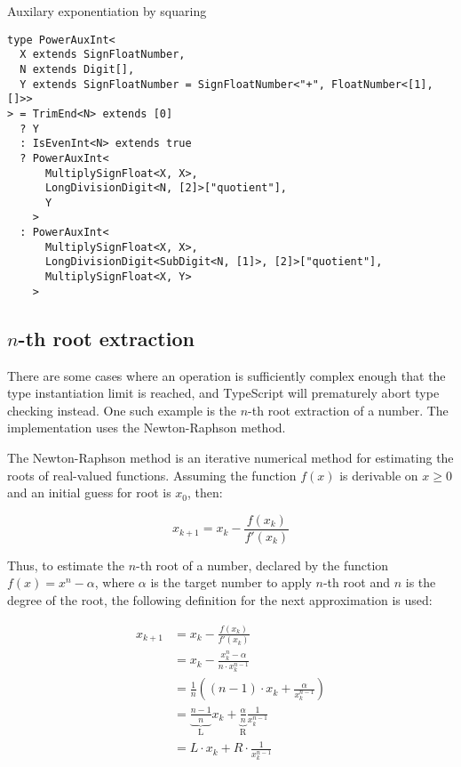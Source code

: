 \begin{listing}[ht]
  \caption{Auxilary exponentiation by squaring}\label{lst:exponentiation-by-squaring-ts}
  \begin{verbatim}
type PowerAuxInt<
  X extends SignFloatNumber,
  N extends Digit[],
  Y extends SignFloatNumber = SignFloatNumber<"+", FloatNumber<[1], []>>
> = TrimEnd<N> extends [0]
  ? Y
  : IsEvenInt<N> extends true
  ? PowerAuxInt<
      MultiplySignFloat<X, X>,
      LongDivisionDigit<N, [2]>["quotient"],
      Y
    >
  : PowerAuxInt<
      MultiplySignFloat<X, X>,
      LongDivisionDigit<SubDigit<N, [1]>, [2]>["quotient"],
      MultiplySignFloat<X, Y>
    >
\end{verbatim}
\end{listing}

\subsection{$n$-th root extraction}

There are some cases where an operation is sufficiently complex enough that the type instantiation limit is reached, and TypeScript will prematurely abort type checking instead. One such example is the $n$-th root extraction of a number. The implementation uses the Newton-Raphson method.

The Newton-Raphson method is an iterative numerical method for estimating the roots of real-valued functions. Assuming the function $f(x)$ is derivable on $x \ge 0$ and an initial guess for root is $x_0$, then:

$$x_{k+1} = x_k - \frac{f(x_k)}{f'(x_k)}$$

Thus, to estimate the $n$-th root of a number, declared by the function $f(x) = x^n - \alpha$, where $\alpha$ is the target number to apply $n$-th root and $n$ is the degree of the root, the following definition for the next approximation is used:

\begin{align*}
  x_{k+1} & = x_k - \frac{f(x_k)}{f'(x_k)}                                                                         \\
          & = x_k - \frac{x_k^n - \alpha}{n \cdot x_k^{n-1}}                                                       \\
          & = \frac{1}{n} \left( (n-1) \cdot x_k + \frac{\alpha}{x_k^{n-1}} \right)                                \\
          & = \underbrace{\frac{n-1}{n}}_\text{L} x_k + \underbrace{\frac{\alpha}{n}}_\text{R} \frac{1}{x_k^{n-1}} \\
          & = L \cdot x_k + R \cdot \frac{1}{x_k^{n-1}}                                                            \\
\end{align*}

